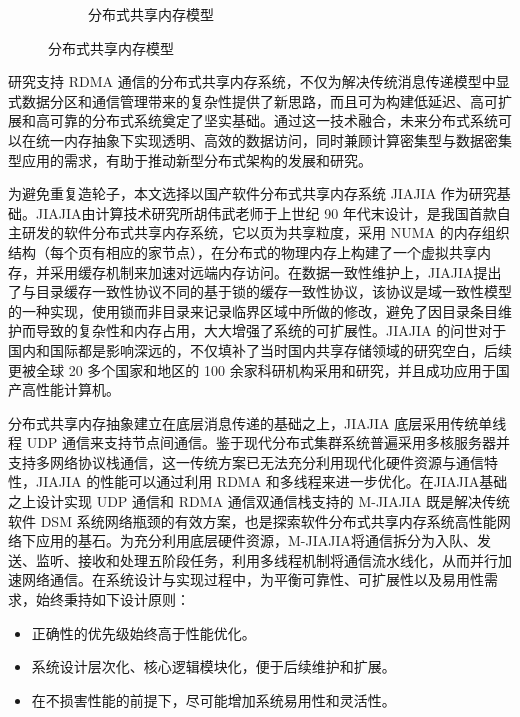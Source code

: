 {\begin{figure}[!htbp]
\begin{subfigure}[b]{0.6\textwidth}
      \caption{分布式共享内存模型}
      \label{fig:dsm}
    \end{subfigure}
    \label{fig:model}
\end{figure}

研究支持 RDMA 通信的分布式共享内存系统，不仅为解决传统消息传递模型中显式数据分区和通信管理带来的复杂性提供了新思路，而且可为构建低延迟、高可扩展和高可靠的分布式系统奠定了坚实基础。通过这一技术融合，未来分布式系统可以在统一内存抽象下实现透明、高效的数据访问，同时兼顾计算密集型与数据密集型应用的需求，有助于推动新型分布式架构的发展和研究。

为避免重复造轮子，本文选择以国产软件分布式共享内存系统 JIAJIA\citep{huweiwu2001sma,huweiwu2024ca,1999huweiwuJIAJIA}  作为研究基础。JIAJIA由计算技术研究所胡伟武老师于上世纪 90 年代末设计，是我国首款自主研发的软件分布式共享内存系统，它以页为共享粒度，采用 NUMA 的内存组织结构（每个页有相应的家节点），在分布式的物理内存上构建了一个虚拟共享内存，并采用缓存机制来加速对远端内存访问。在数据一致性维护上，JIAJIA提出了与目录缓存一致性协议不同的基于锁的缓存一致性协议，该协议是域一致性模型的一种实现，使用锁而非目录来记录临界区域中所做的修改，避免了因目录条目维护而导致的复杂性和内存占用，大大增强了系统的可扩展性。JIAJIA 的问世对于国内和国际都是影响深远的，不仅填补了当时国内共享存储领域的研究空白，后续更被全球 20 多个国家和地区的 100 余家科研机构采用和研究，并且成功应用于国产高性能计算机。

分布式共享内存抽象建立在底层消息传递的基础之上，JIAJIA 底层采用传统单线程 UDP 通信来支持节点间通信。鉴于现代分布式集群系统普遍采用多核服务器并支持多网络协议栈通信，这一传统方案已无法充分利用现代化硬件资源与通信特性，JIAJIA 的性能可以通过利用 RDMA 和多线程来进一步优化。在JIAJIA基础之上设计实现 UDP 通信和 RDMA 通信双通信栈支持的 M-JIAJIA 既是解决传统软件 DSM 系统网络瓶颈的有效方案，也是探索软件分布式共享内存系统高性能网络下应用的基石。为充分利用底层硬件资源，M-JIAJIA将通信拆分为入队、发送、监听、接收和处理五阶段任务，利用多线程机制将通信流水线化，从而并行加速网络通信。在系统设计与实现过程中，为平衡可靠性、可扩展性以及易用性需求，始终秉持如下设计原则：
\begin{itemize}
    \item 正确性的优先级始终高于性能优化。
    \item 系统设计层次化、核心逻辑模块化，便于后续维护和扩展。
    \item 在不损害性能的前提下，尽可能增加系统易用性和灵活性。
\end{itemize}

}
